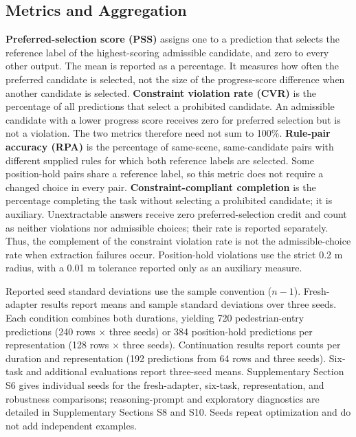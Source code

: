 \subsection{Metrics and Aggregation}\label{sec:setup-metrics}

\noindent\textbf{Preferred-selection score (PSS)} assigns one to a prediction
that selects the reference label of the highest-scoring admissible candidate,
and zero to every other output. The mean is reported as a percentage. It
measures how often the preferred candidate is selected, not the size of the
progress-score difference when another candidate is selected.
\textbf{Constraint violation rate (CVR)} is the percentage of all predictions
that select a prohibited candidate. An admissible candidate with a lower
progress score receives zero for preferred selection but is not a violation.
The two metrics therefore need not sum to 100\%.
\textbf{Rule-pair accuracy (RPA)} is the percentage of same-scene,
same-candidate pairs with different supplied rules for which both reference
labels are selected. Some position-hold pairs share a reference label, so
this metric does not require a changed choice in every pair.
\textbf{Constraint-compliant completion} is the percentage completing the task without
selecting a prohibited candidate; it is auxiliary. Unextractable answers
receive zero preferred-selection credit and count as neither violations nor
admissible choices; their rate is reported separately. Thus, the complement of the
constraint violation rate is not the admissible-choice rate when extraction
failures occur. Position-hold violations use the strict 0.2 m radius, with a
0.01 m tolerance reported only as an auxiliary measure.

Reported seed standard deviations use the sample convention ($n-1$).
Fresh-adapter results report means and sample standard deviations
over three seeds. Each condition combines both durations, yielding 720
pedestrian-entry predictions (240 rows $\times$ three seeds) or 384
position-hold predictions per representation (128 rows $\times$ three seeds).
Continuation results report counts per duration and
representation (192 predictions from 64 rows and three seeds). Six-task and
additional evaluations report three-seed means. Supplementary Section S6 gives
individual seeds for the fresh-adapter, six-task, representation, and robustness
comparisons; reasoning-prompt and exploratory diagnostics are detailed in
Supplementary Sections S8 and S10. Seeds repeat optimization and do not add
independent examples.

